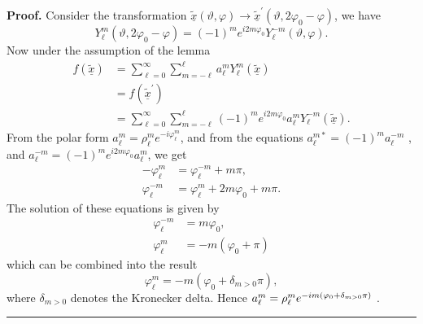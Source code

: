 \documentclass[preprint,11pt,a4paper]{elsarticle}
\newenvironment{proof}[1][Proof]{\noindent\textbf{#1.} }{\ \rule{0.5em}{0.5em}}
\begin{document}
\begin{proof}
Consider the transformation $\underline{\widetilde{x}}\left( \vartheta
,\varphi\right) \rightarrow\underline{\widetilde{x}}^{\prime}\left(
\vartheta,2\varphi_{0}-\varphi\right) $, we have 
\begin{equation*}
Y_{\ell}^{m}\left( \vartheta,2\varphi_{0}-\varphi\right) =\left( -1\right)
^{m}e^{i2m\varphi_{0}}Y_{\ell}^{-m}\left( \vartheta,\varphi\right) .
\end{equation*}
Now under the assumption of the lemma 
\begin{align*}
f\left( \underline{\widetilde{x}}\right) &
=\sum_{\ell=0}^{\infty}\sum_{m=-\ell}^{\ell}a_{\ell}^{m}Y_{\ell}^{m}\left( 
\underline{\widetilde{x}}\right) \\
& =f\left( \underline{\widetilde{x}}^{\prime}\right) \\
& =\sum_{\ell=0}^{\infty}\sum_{m=-\ell}^{\ell}\left( -1\right)
^{m}e^{i2m\varphi_{0}}a_{\ell}^{m}Y_{\ell}^{-m}\left( \underline{\widetilde{x%
}}\right) .
\end{align*}
From the polar form $a_{\ell}^{m}=\rho_{\ell}^{m}e^{-i\varphi_{\ell}^{m}}$,
and from the equations $a_{\ell}^{m\ast}=\left( -1\right) ^{m}a_{\ell}^{-m}$%
, and $a_{\ell}^{-m}=\left( -1\right) ^{m}e^{i2m\varphi_{0}}a_{\ell}^{m}$,
we get 
\begin{align*}
-\varphi_{\ell}^{m} & =\varphi_{\ell}^{-m}+m\pi, \\
\varphi_{\ell}^{-m} & =\varphi_{\ell}^{m}+2m\varphi_{0}+m\pi.
\end{align*}
The solution of these equations is given by 
\begin{align*}
\varphi_{\ell}^{-m} & =m\varphi_{0}, \\
\varphi_{\ell}^{m} & =-m\left( \varphi_{0}+\pi\right)
\end{align*}
which can be combined into the result 
\begin{equation*}
\varphi_{\ell}^{m}=-m\left( \varphi_{0}+\delta_{m>0}\pi\right) ,
\end{equation*}
where $\delta_{m>0}$ denotes the Kronecker delta. Hence $a_{\ell}^{m}=\rho_{%
\ell}^{m}e^{-im\left( \varphi_{0}+\delta_{m>0}\pi\right) }$ .
\end{proof}

\begin{comment}%

\end{comment}%



\end{document}
